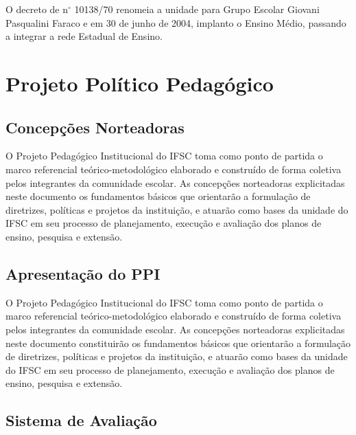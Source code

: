 O decreto de n$^\circ$ 10138/70 renomeia a unidade para Grupo Escolar Giovani Pasqualini Faraco e em 30 de junho de 2004, implanto o Ensino Médio, passando a integrar a rede Estadual de Ensino.

\section{Projeto Político Pedagógico}

\subsection{Concepções Norteadoras}
O Projeto Pedagógico Institucional do IFSC toma como ponto de partida o marco referencial teórico-metodológico elaborado e construído de forma coletiva pelos integrantes da comunidade escolar. As concepções norteadoras explicitadas neste documento os fundamentos básicos que orientarão a formulação de diretrizes, políticas e projetos da instituição, e atuarão como bases da unidade do IFSC em seu processo de planejamento, execução e avaliação dos planos de ensino, pesquisa e extensão.
\subsection{Apresentação do PPI}
O Projeto Pedagógico Institucional do IFSC toma como ponto de partida o marco referencial teórico-metodológico elaborado e construído de forma coletiva pelos integrantes da comunidade escolar. As concepções norteadoras explicitadas neste documento constituirão os fundamentos básicos que orientarão a formulação de diretrizes, políticas e projetos da instituição, e atuarão como bases da unidade do IFSC em seu processo de planejamento, execução e avaliação dos planos de ensino, pesquisa e extensão. \cite{GPTPPP:2021}
\subsection{Sistema de Avaliação}